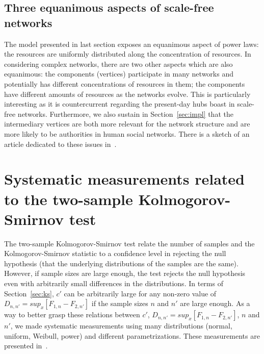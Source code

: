 \begin{apendicesenv}
\subsection{Three equanimous aspects of scale-free networks}
The model presented in last section exposes an equanimous aspect of power laws:
the resources are uniformly distributed along the concentration of resources.
In considering complex networks, there are two other aspects which are also equanimous:
the components (vertices) participate in many networks and potentially has different concentrations
of resources in them; the components have different amounts of resources as the networks evolve.
This is particularly interesting as it is countercurrent regarding the present-day hubs boast
in scale-free networks.
Furthermore, we also sustain in Section~\ref{sec:impl} that the intermediary vertices are both more relevant for the
network structure and are more likely to be authorities in human social networks.
There is a sketch of an article dedicated to these issues in~\cite{eqFree}.

\section{Systematic measurements related to the two-sample Kolmogorov-Smirnov test}
The two-sample Kolmogorov-Smirnov test relate the number of samples and the Kolmogorov-Smirnov statistic
to a confidence level in rejecting the null hypothesis (that the underlying distributions of the samples are the same).
However, if sample sizes are large enough, the test rejects the null hypothesis even with arbitrarily small differences
in the distributions.
In terms of Section~\ref{sec:ks}, $c'$ can be arbitrarily large for any non-zero value of
$D_{n,n'}=sup_x[F_{1,n}-F_{2,n'}]$
if the sample sizes $n$ and $n'$ are large enough.
As a way to better grasp these relations between 
$c'$,
$D_{n,n'}=sup_x[F_{1,n}-F_{2,n'}]$,
$n$ and $n'$, we made systematic measurements using many distributions
(normal, uniform, Weibull, power) and different parametrizations.
These measurements are presented in~\cite{kolmSmir}.


\end{apendicesenv}
